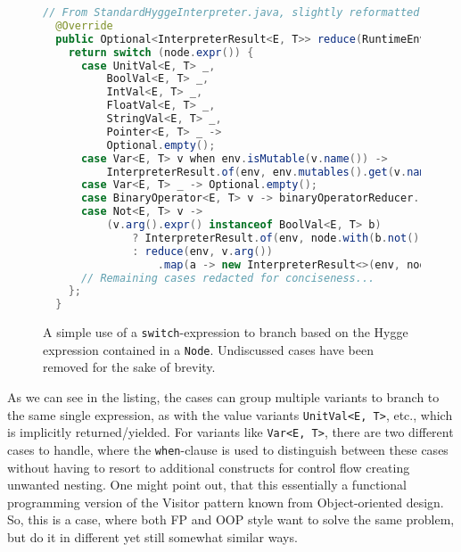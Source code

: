 \begin{figure}[H]
\centering
\begin{lstlisting}[language=Java]
  // From StandardHyggeInterpreter.java, slightly reformatted
  @Override
  public Optional<InterpreterResult<E, T>> reduce(RuntimeEnvironment<E, T> env, Node<E, T> node) {
    return switch (node.expr()) {
      case UnitVal<E, T> _,
          BoolVal<E, T> _,
          IntVal<E, T> _,
          FloatVal<E, T> _,
          StringVal<E, T> _,
          Pointer<E, T> _ ->
          Optional.empty();
      case Var<E, T> v when env.isMutable(v.name()) ->
          InterpreterResult.of(env, env.mutables().get(v.name()));
      case Var<E, T> _ -> Optional.empty();
      case BinaryOperator<E, T> v -> binaryOperatorReducer.reduce(this, env, node, v);
      case Not<E, T> v ->
          (v.arg().expr() instanceof BoolVal<E, T> b)
              ? InterpreterResult.of(env, node.with(b.not()))
              : reduce(env, v.arg())
                  .map(a -> new InterpreterResult<>(env, node.with(new Not<>(a.node()))));
      // Remaining cases redacted for conciseness...
    };
  }
\end{lstlisting}
\caption{A simple use of a \texttt{switch}-expression to branch based on the Hygge expression contained in a \texttt{Node}. Undiscussed cases have been removed for the sake of brevity.}
\label{fig:switch_expression_values}
\end{figure}

As we can see in the listing, the cases can group multiple variants to branch to the same single expression, as with
the value variants \texttt{UnitVal<E, T>}, etc., which is implicitly returned/yielded. For variants like \texttt{Var<E, T>}, there are
two different cases to handle, where the \texttt{when}-clause is used to distinguish between these cases without having to resort to
additional constructs for control flow creating unwanted nesting. One might point out, that this essentially a functional programming
version of the Visitor pattern known from Object-oriented design. So, this is a case, where both FP and OOP style want to solve the
same problem, but do it in different yet still somewhat similar ways.

